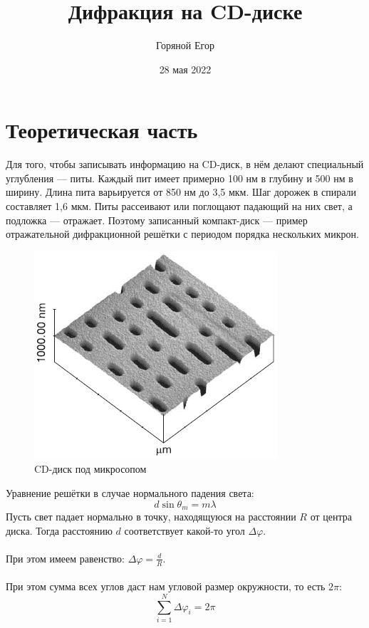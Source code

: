 \documentclass[a4paper]{article}
\begin{document}
\author{Горяной Егор}
\date{28 мая 2022}
\title{Дифракция на CD-диске}
\maketitle


\section{Теоретическая часть}
{Для того, чтобы записывать информацию на CD-диск, в нём делают специальный углубления --- питы. Каждый пит имеет примерно 100 нм в глубину и 500 нм в ширину. Длина пита варьируется от 850 нм до 3,5 мкм. Шаг дорожек в спирали составляет 1,6 мкм. Питы рассеивают или поглощают падающий на них свет, а подложка — отражает. Поэтому записанный компакт-диск — пример отражательной дифракционной решётки с периодом порядка нескольких микрон.}
\begin{figure}[H]
    \centering
    \includegraphics[scale=1]{cd_disk.png}
    \caption{CD-диск под микросопом}
\end{figure}
Уравнение решётки в случае нормального падения света:
\begin{equation}\label{eq1}
d\sin\theta_m=m\lambda
\end{equation}
Пусть свет падает нормально в точку, находящуюся на расстоянии $R$ от центра диска. Тогда расстоянию $d$ соответствует какой-то угол $\Delta\varphi$.\\
\\
При этом имеем равенство: $\Delta\varphi=\displaystyle\frac{d}{R}$.\\
\\
При этом сумма всех углов даст нам угловой размер окружности, то есть $2\pi$:
\begin{equation}\label{eq2}
\displaystyle\sum\limits_{i=1}^{N}\Delta\varphi_i =2\pi
\end{equation}
\end{document}
